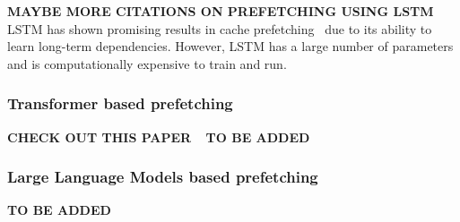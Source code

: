 \textbf{MAYBE MORE CITATIONS ON PREFETCHING USING LSTM}
LSTM has shown promising results in cache prefetching~\cite{LMAP,Twilight} due to its ability to learn long-term dependencies. However, LSTM has a large number of parameters and is computationally expensive to train and run. 

\subsubsection{Transformer based prefetching}

\textbf{CHECK OUT THIS PAPER}
~\cite{Twilight}
\textbf{TO BE ADDED}

\subsubsection{Large Language Models based prefetching}

\textbf{TO BE ADDED}